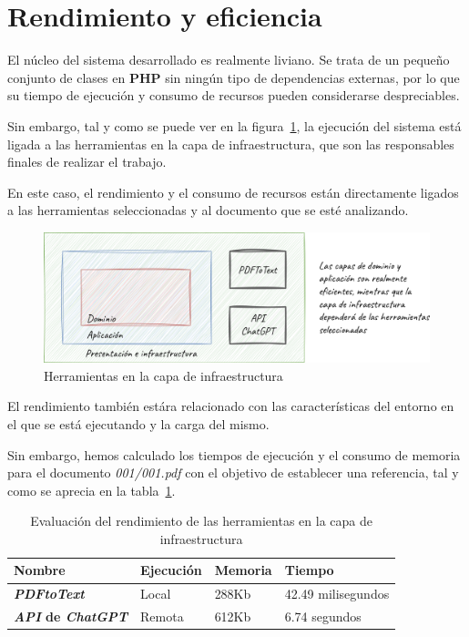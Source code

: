 \section{Rendimiento y eficiencia}

El núcleo del sistema desarrollado es realmente liviano.
Se trata de un pequeño conjunto de clases en \textbf{PHP} sin ningún tipo de dependencias externas, por lo que su
tiempo de ejecución y consumo de recursos pueden considerarse despreciables.

Sin embargo, tal y como se puede ver en la figura~\ref{fig:chapter_5.2.performance}, la ejecución del sistema está
ligada a las herramientas en la capa de infraestructura, que son las responsables finales de realizar el trabajo.

En este caso, el rendimiento y el consumo de recursos están directamente ligados a las herramientas seleccionadas y al
documento que se esté analizando.

\begin{figure}[ht]
    \begin{center}
        \includegraphics[width=\textwidth]{./chapter/5/images/chapter_5.2.performance}
        \caption{Herramientas en la capa de infraestructura}
        \label{fig:chapter_5.2.performance}
    \end{center}
\end{figure}

El rendimiento también estára relacionado con las características del entorno en el que se está ejecutando y la
carga del mismo.

Sin embargo, hemos calculado los tiempos de ejecución y el consumo de memoria para el documento \textit{001/001.pdf}
con el objetivo de establecer una referencia, tal y como se aprecia en la tabla~\ref{tab:execution_performance}.

\begin{table}[h]
    \renewcommand{\arraystretch}{1.5}
    \setlength{\tabcolsep}{10pt}
    \begin{tabular}{>{\bfseries}p{} p{} p{} p{}}
        \toprule
        \textbf{Nombre}                  & \textbf{Ejecución} & \textbf{Memoria} & \textbf{Tiempo}    \\
        \midrule
        \textit{PDFtoText}               & Local              & 288Kb            & 42.49 milisegundos \\
        \textit{API} de \textit{ChatGPT} & Remota             & 612Kb            & 6.74 segundos      \\
        \bottomrule
    \end{tabular}
    \caption{Evaluación del rendimiento de las herramientas en la capa de infraestructura}
    \label{tab:execution_performance}
\end{table}


